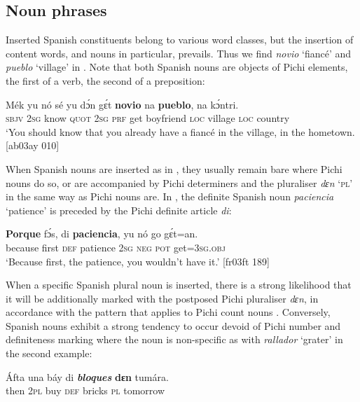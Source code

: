 \subsection{Noun phrases}\label{sec:13.2.1}

Inserted Spanish constituents belong to various word classes, but the insertion of content words, and nouns in particular, prevails. Thus we find \textit{novio} ‘fiancé’ and \textit{pueblo} ‘village’\textit{} in . Note that both Spanish nouns are objects of Pichi elements, the first of a verb, the second of a preposition: 


\ea%
    \label{ex:key:1696}
    \gll Mék    yu  nó    sé    yu  dɔ́n  gɛ́t  \textbf{novio}    na  \textbf{pueblo},
na  kɔ́ntri.\\
\textsc{sbjv}    \textsc{2sg}  know  \textsc{quot}    \textsc{2sg}  \textsc{prf}  get  boyfriend  \textsc{loc}  village
\textsc{loc}  country\\
\glt ‘You should know that you already have a fiancé in the village, 
in the hometown. [ab03ay 010]
\z

When Spanish nouns are inserted as in , they usually remain bare where Pichi nouns do so, or are accompanied by Pichi determiners and the pluraliser \textit{dɛn} ‘\textsc{pl’} in the same way as Pichi nouns are. In , the definite Spanish noun \textit{paciencia} ‘patience’ is preceded by the Pichi definite article \textit{di}: 


\ea%
    \label{ex:key:1697}
    \gll \textbf{Porque}  fɔ́s,    di  \textbf{paciencia},  yu  nó  go  gɛ́t=an.\\
because  first    \textsc{def}  patience    \textsc{2sg}  \textsc{neg}  \textsc{pot}  get=\textsc{3sg.obj}\\

\glt ‘Because first, the patience, you wouldn’t have it.’ [fr03ft 189]
\z

When a specific Spanish plural noun is inserted, there is a strong likelihood that it will be additionally marked with the postposed Pichi pluraliser \textit{dɛn}, in accordance with the pattern that applies to Pichi count nouns . Conversely, Spanish nouns exhibit a strong tendency to occur devoid of Pichi number and definiteness marking where the noun is non-specific as with \textit{rallador} ‘grater’ in the second example:


\ea%
    \label{ex:key:1698}
    \gll \'{A}fta    una  báy  di  \textbf{\textit{bloques}}  \textbf{dɛn}  tumára.\\
then  \textsc{2pl}  buy  \textsc{def}  bricks  \textsc{pl}  tomorrow\\

